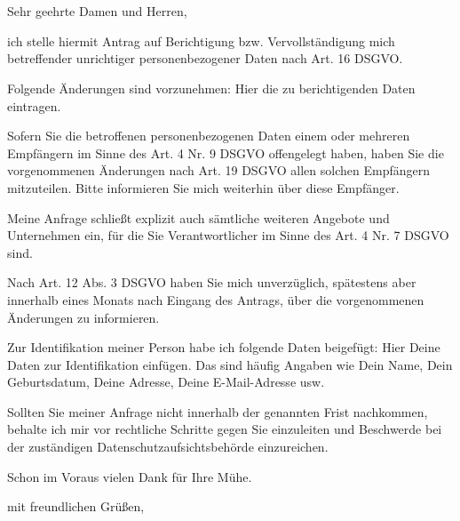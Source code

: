 \documentclass[a4paper, pagenumber=footmiddle, parskip=half,
	foldmarks=true,foldmarks=BmT, fromalign=right,
	fromphone=false, fromfax=false, fromemail=true, fromurl=false, fromlogo=false,
	fromrule=false, version=last]{scrlttr2}
\begin{document}
\begin{letter}{
	\EmpfaengerName\\
	\EmpfaengerStrasse\\
	\EmpfaengerStadt
}
\flushleft
\opening{Sehr geehrte Damen und Herren,}

ich stelle hiermit Antrag auf Berichtigung bzw. Vervollständigung mich betreffender unrichtiger personenbezogener Daten nach Art. 16 DSGVO.

Folgende Änderungen sind vorzunehmen:
Hier die zu berichtigenden Daten eintragen.

Sofern Sie die betroffenen personenbezogenen Daten einem oder mehreren Empfängern im Sinne des Art. 4 Nr. 9 DSGVO offengelegt haben, haben Sie die vorgenommenen Änderungen nach Art. 19 DSGVO allen solchen Empfängern mitzuteilen. Bitte informieren Sie mich weiterhin über diese Empfänger.

Meine Anfrage schließt explizit auch sämtliche weiteren Angebote und Unternehmen ein, für die Sie Verantwortlicher im Sinne des Art. 4 Nr. 7 DSGVO sind.

Nach Art. 12 Abs. 3 DSGVO haben Sie mich unverzüglich, spätestens aber innerhalb eines Monats nach Eingang des Antrags, über die vorgenommenen Änderungen zu informieren.

Zur Identifikation meiner Person habe ich folgende Daten beigefügt:
Hier Deine Daten zur Identifikation einfügen. Das sind häufig Angaben wie Dein Name, Dein Geburtsdatum, Deine Adresse, Deine E-Mail-Adresse usw.

Sollten Sie meiner Anfrage nicht innerhalb der genannten Frist nachkommen, behalte ich mir vor rechtliche Schritte gegen Sie einzuleiten und Beschwerde bei der zuständigen Datenschutzaufsichtsbehörde einzureichen.

Schon im Voraus vielen Dank für Ihre Mühe.


\closing{mit freundlichen Grüßen,}


\end{letter}
\end{document}
